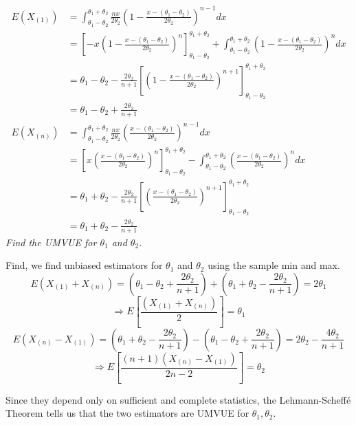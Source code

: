 \documentclass[11pt]{report}
\begin{document}
\begin{align*}
E(X_{(1)}) &= \int_{\theta_1 - \theta_2}^{\theta_1 + \theta_2} \frac{nx}{2 \theta_2} \left( 1-\frac{x-(\theta_1 - \theta_2)}{2 \theta_2} \right)^{n-1} dx \\
	&= \left[ -x\left( 1 - \frac{x - (\theta_1-\theta_2)}{2 \theta_2} \right)^n \right]_{\theta_1 -\theta_2}^{\theta_1 + \theta_2} + \int_{\theta_1 - \theta_2}^{\theta_1 + \theta_2} \left( 1-\frac{x-(\theta_1 - \theta_2)}{2 \theta_2} \right)^{n} dx \\
	&= \theta_1 - \theta_2 - \frac{2 \theta_2}{n+1} \left[ \left( 1 - \frac{x - (\theta_1-\theta_2)}{2 \theta_2} \right)^{n+1} \right]_{\theta_1 -\theta_2}^{\theta_1 + \theta_2} \\
	&= \theta_1 - \theta_2 + \frac{2 \theta_2}{n+1} \\
%
E(X_{(n)}) &= \int_{\theta_1 - \theta_2}^{\theta_1 + \theta_2} \frac{nx}{2 \theta_2} \left( \frac{x-(\theta_1 - \theta_2)}{2 \theta_2} \right)^{n-1} dx \\
	&= \left[ x\left( \frac{x - (\theta_1-\theta_2)}{2 \theta_2} \right)^n \right]_{\theta_1 -\theta_2}^{\theta_1 + \theta_2} - \int_{\theta_1 - \theta_2}^{\theta_1 + \theta_2} \left( \frac{x-(\theta_1 - \theta_2)}{2 \theta_2} \right)^{n} dx \\
	&= \theta_1 + \theta_2 - \frac{2 \theta_2}{n+1} \left[ \left( \frac{x - (\theta_1-\theta_2)}{2 \theta_2} \right)^{n+1} \right]_{\theta_1 -\theta_2}^{\theta_1 + \theta_2} \\
	&= \theta_1 + \theta_2 - \frac{2 \theta_2}{n+1}
\end{align*}
\newline
\newline
\emph{Find the UMVUE for $\theta_1$ and $\theta_2$.}

Find, we find unbiased estimators for $\theta_1$ and $\theta_2$ using the sample min and max.
\[ E( X_{(1)} + X_{(n)} ) = \left( \theta_1 - \theta_2 + \frac{2 \theta_2}{n+1} \right) + \left( \theta_1 + \theta_2 - \frac{2 \theta_2}{n+1} \right) = 2 \theta_1 \]
\[ \Rightarrow E \left[ \frac{( X_{(1)} + X_{(n)} )}{2} \right] = \theta_1 \]
\[ E( X_{(n)} - X_{(1)} ) = \left( \theta_1 + \theta_2 - \frac{2 \theta_2}{n+1} \right) - \left( \theta_1 - \theta_2 + \frac{2 \theta_2}{n+1} \right) = 2 \theta_2 - \frac{4 \theta_2}{n+1} \]
\[ \Rightarrow E \left[ \frac{ (n+1) \left( X_{(n)} - X_{(1)} \right) }{2n-2} \right] = \theta_2 \]

Since they depend only on sufficient and complete statistics, the Lehmann-Scheff\'{e} Theorem tells us that the two estimators are UMVUE for $\theta_1, \theta_2$.

\end{document}
